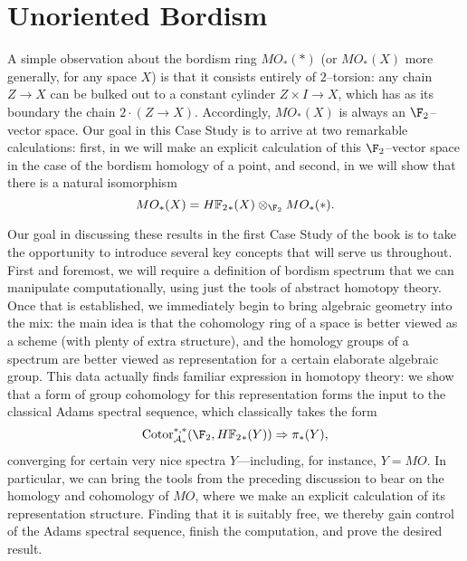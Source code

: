 
\chapter{Unoriented Bordism}\label{UnorientedBordismChapter}




A simple observation about the bordism ring \(MO_*(*)\) (or \(MO_*(X)\) more generally, for any space \(X\)) is that it consists entirely of \(2\)--torsion: any chain \(Z \to X\) can be bulked out to a constant cylinder \(Z \times I \to X\), which has as its boundary the chain \(2 \cdot (Z \to X)\).  Accordingly, \(MO_*(X)\) is always an \(\F_2\)--vector space.  Our goal in this Case Study is to arrive at two remarkable calculations: first, in  we will make an explicit calculation of this \(\F_2\)--vector space in the case of the bordism homology of a point, and second, in  we will show that there is a natural isomorphism \[MO_*(X) = \HFtwo_*(X) \otimes_{\F_2} MO_*(*).\]

Our goal in discussing these results in the first Case Study of the book is to take the opportunity to introduce several key concepts that will serve us throughout.  First and foremost, we will require a definition of bordism spectrum that we can manipulate computationally, using just the tools of abstract homotopy theory.  Once that is established, we immediately begin to bring algebraic geometry into the mix: the main idea is that the cohomology ring of a space is better viewed as a scheme (with plenty of extra structure), and the homology groups of a spectrum are better viewed as representation for a certain elaborate algebraic group.  This data actually finds familiar expression in homotopy theory: we show that a form of group cohomology for this representation forms the input to the classical Adams spectral sequence, which classically takes the form \[\Cotor_{\mathcal A_*}^{*, *}(\F_2, \HFtwo_*(Y)) \Rightarrow \pi_*(Y),\] converging for certain very nice spectra \(Y\)---including, for instance, \(Y = MO\).  In particular, we can bring the tools from the preceding discussion to bear on the homology and cohomology of \(MO\), where we make an explicit calculation of its representation structure.  Finding that it is suitably free, we thereby gain control of the Adams spectral sequence, finish the computation, and prove the desired result.

